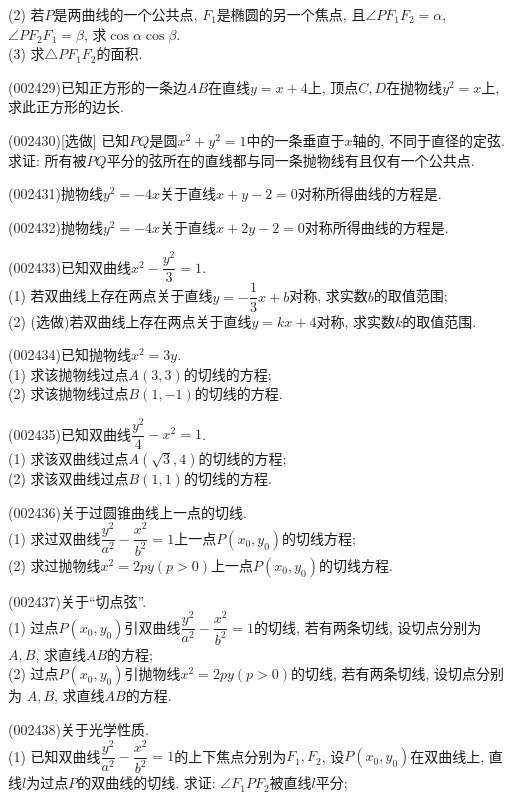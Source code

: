 (2) 若$P$是两曲线的一个公共点, $F_1$是椭圆的另一个焦点, 且$\angle PF_1F_2=\alpha$, $\angle PF_2F_1=\beta$, 求$\cos\alpha\cos\beta$.\\ 
(3) 求$\triangle PF_1F_2$的面积.
\item (002429)已知正方形的一条边$AB$在直线$y=x+4$上, 顶点$C,D$在抛物线$y^2=x$上, 求此正方形的边长.
\item (002430)[选做]
已知$PQ$是圆$x^2+y^2=1$中的一条垂直于$x$轴的, 不同于直径的定弦. 求证: 所有被$PQ$平分的弦所在的直线都与同一条抛物线有且仅有一个公共点.
\item (002431)抛物线$y^2=-4x$关于直线$x+y-2=0$对称所得曲线的方程是.
\item (002432)抛物线$y^2=-4x$关于直线$x+2y-2=0$对称所得曲线的方程是.
\item (002433)已知双曲线$x^2-\dfrac{y^2}{3}=1$.\\ 
(1) 若双曲线上存在两点关于直线$y=-\dfrac{1}{3}x+b$对称, 求实数$b$的取值范围;\\ 
(2) (选做)若双曲线上存在两点关于直线$y=kx+4$对称, 求实数$k$的取值范围.
\item (002434)已知抛物线$x^2=3y$.\\ 
(1) 求该抛物线过点$A(3,3)$的切线的方程;\\ 
(2) 求该抛物线过点$B(1,-1)$的切线的方程.
\item (002435)已知双曲线$\dfrac{y^2}{4}-x^2=1$.\\ 
(1) 求该双曲线过点$A(\sqrt{3},4)$的切线的方程;\\ 
(2) 求该双曲线过点$B(1,1)$的切线的方程.
\item (002436)关于过圆锥曲线上一点的切线.\\ 
(1) 求过双曲线$\dfrac{y^2}{a^2}-\dfrac{x^2}{b^2}=1$上一点$P(x_0,y_0)$的切线方程;\\ 
(2) 求过抛物线$x^2=2py(p>0)$上一点$P(x_0,y_0)$的切线方程.
\item (002437)关于``切点弦''.\\ 
(1) 过点$P(x_0,y_0)$引双曲线$\dfrac{y^2}{a^2}-\dfrac{x^2}{b^2}=1$的切线, 若有两条切线, 设切点分别为
$A,B$, 求直线$AB$的方程;\\ 
(2) 过点$P(x_0,y_0)$引抛物线$x^2=2py(p>0)$的切线, 若有两条切线, 设切点分别为
$A,B$, 求直线$AB$的方程.
\item (002438)关于光学性质.\\ 
(1) 已知双曲线$\dfrac{y^2}{a^2}-\dfrac{x^2}{b^2}=1$的上下焦点分别为$F_1,F_2$,
设$P(x_0,y_0)$在双曲线上, 直线$l$为过点$P$的双曲线的切线. 求证: $\angle F_1PF_2$被直线$l$平分;\\ 
